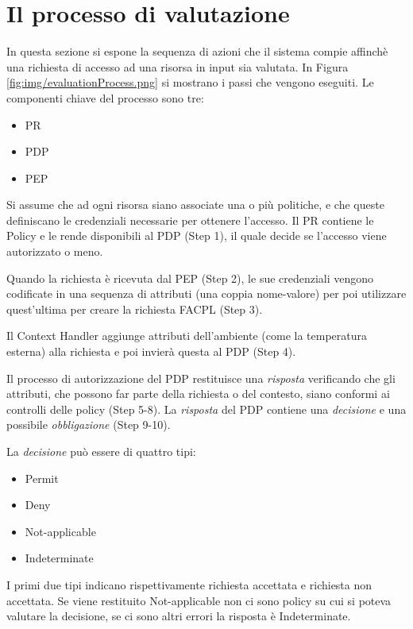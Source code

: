 \section{Il processo di valutazione}
\label{sec:Il processo di valutazione Facpl}
In questa sezione si espone la sequenza di azioni che il sistema compie affinchè una richiesta
di accesso ad una risorsa in input sia valutata.
In Figura \ref{fig:img/evaluationProcess.png} si mostrano i passi che vengono eseguiti.
Le componenti chiave del processo sono tre:
\begin{itemize}
  \renewcommand\labelitemi{--}
  \item \ac{PR}
  \item \acf{PDP}
  \item \acf{PEP}
\end{itemize}
Si assume che ad ogni risorsa siano associate una o più politiche, e che queste definiscano le credenziali
necessarie per ottenere l'accesso. Il \ac{PR} contiene le Policy e le rende disponibili al \ac{PDP} (Step 1), il
quale decide se l'accesso viene autorizzato o meno. \par
Quando la richiesta è ricevuta dal \ac{PEP} (Step 2), le sue credenziali vengono codificate in una sequenza
di attributi (una coppia nome-valore) per poi utilizzare quest'ultima per creare la richiesta \ac{FACPL} (Step 3).\par
Il Context Handler aggiunge attributi dell'ambiente (come la temperatura esterna) alla richiesta e
poi invierà questa al \ac{PDP} (Step 4).\par
Il processo di autorizzazione del \ac{PDP} restituisce una \emph{risposta} verificando che gli attributi, che possono far
parte della richiesta o del contesto, siano conformi ai controlli delle policy (Step 5-8). La \emph{risposta} del \ac{PDP}
contiene una \emph{decisione} e una possibile \emph{obbligazione} (Step 9-10).\par
La \emph{decisione} può essere di quattro tipi:
\begin{itemize}
  \renewcommand\labelitemi{--}
  \item Permit
  \item Deny
  \item Not-applicable
  \item Indeterminate
\end{itemize}
I primi due tipi indicano rispettivamente richiesta accettata e richiesta non accettata. Se viene restituito Not-applicable
non ci sono policy su cui si poteva valutare la decisione, se ci sono altri errori la risposta è Indeterminate.
